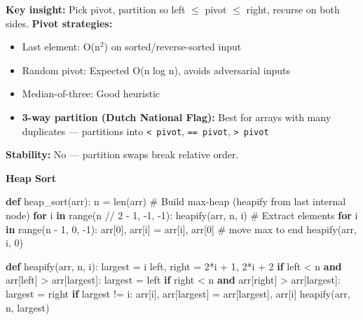 \documentclass[11pt]{article}
\providecommand{\tightlist}{\setlength{\itemsep}{1pt}\setlength{\parskip}{0pt}}
\newenvironment{Shaded}{\begin{snugshade}}{\end{snugshade}}
\newcommand{\BuiltInTok}[1]{\textcolor[rgb]{0.50,0.55,0.55}{#1}}
\newcommand{\CommentTok}[1]{\textcolor[rgb]{0.48,0.49,0.49}{#1}}
\newcommand{\ControlFlowTok}[1]{\textcolor[rgb]{0.99,0.74,0.29}{\textbf{#1}}}
\newcommand{\DecValTok}[1]{\textcolor[rgb]{0.96,0.45,0.00}{#1}}
\newcommand{\KeywordTok}[1]{\textcolor[rgb]{0.81,0.81,0.76}{\textbf{#1}}}
\newcommand{\NormalTok}[1]{\textcolor[rgb]{0.81,0.81,0.76}{#1}}
\newcommand{\OperatorTok}[1]{\textcolor[rgb]{0.81,0.81,0.76}{#1}}
\begin{document}
\textbf{Key insight:} Pick pivot, partition so left \(\leq\) pivot \(\leq\) right, recurse on both sides.
\textbf{Pivot strategies:}

\begin{itemize}
\tightlist
\item
  Last element: O(n\(^2\)) on sorted/reverse-sorted input
\item
  Random pivot: Expected O(n log n), avoids adversarial inputs
\item
  Median-of-three: Good heuristic
\item
  \textbf{3-way partition (Dutch National Flag):} Best for arrays with many duplicates --- partitions into \texttt{\textless{}\ pivot}, \texttt{==\ pivot}, \texttt{\textgreater{}\ pivot}
\end{itemize}

\textbf{Stability:} No --- partition swaps break relative order.

\textbf{Heap Sort}


\begin{Shaded}
\begin{Highlighting}[]
\KeywordTok{def}\NormalTok{ heap\_sort(arr):}
\NormalTok{    n }\OperatorTok{=} \BuiltInTok{len}\NormalTok{(arr)}
    \CommentTok{\# Build max{-}heap (heapify from last internal node)}
    \ControlFlowTok{for}\NormalTok{ i }\KeywordTok{in} \BuiltInTok{range}\NormalTok{(n }\OperatorTok{//} \DecValTok{2} \OperatorTok{{-}} \DecValTok{1}\NormalTok{, }\OperatorTok{{-}}\DecValTok{1}\NormalTok{, }\OperatorTok{{-}}\DecValTok{1}\NormalTok{):}
\NormalTok{        heapify(arr, n, i)}
    \CommentTok{\# Extract elements}
    \ControlFlowTok{for}\NormalTok{ i }\KeywordTok{in} \BuiltInTok{range}\NormalTok{(n }\OperatorTok{{-}} \DecValTok{1}\NormalTok{, }\DecValTok{0}\NormalTok{, }\OperatorTok{{-}}\DecValTok{1}\NormalTok{):}
\NormalTok{        arr[}\DecValTok{0}\NormalTok{], arr[i] }\OperatorTok{=}\NormalTok{ arr[i], arr[}\DecValTok{0}\NormalTok{]  }\CommentTok{\# move max to end}
\NormalTok{        heapify(arr, i, }\DecValTok{0}\NormalTok{)}

\KeywordTok{def}\NormalTok{ heapify(arr, n, i):}
\NormalTok{    largest }\OperatorTok{=}\NormalTok{ i}
\NormalTok{    left, right }\OperatorTok{=} \DecValTok{2}\OperatorTok{*}\NormalTok{i }\OperatorTok{+} \DecValTok{1}\NormalTok{, }\DecValTok{2}\OperatorTok{*}\NormalTok{i }\OperatorTok{+} \DecValTok{2}
    \ControlFlowTok{if}\NormalTok{ left }\OperatorTok{\textless{}}\NormalTok{ n }\KeywordTok{and}\NormalTok{ arr[left] }\OperatorTok{\textgreater{}}\NormalTok{ arr[largest]: largest }\OperatorTok{=}\NormalTok{ left}
    \ControlFlowTok{if}\NormalTok{ right }\OperatorTok{\textless{}}\NormalTok{ n }\KeywordTok{and}\NormalTok{ arr[right] }\OperatorTok{\textgreater{}}\NormalTok{ arr[largest]: largest }\OperatorTok{=}\NormalTok{ right}
    \ControlFlowTok{if}\NormalTok{ largest }\OperatorTok{!=}\NormalTok{ i:}
\NormalTok{        arr[i], arr[largest] }\OperatorTok{=}\NormalTok{ arr[largest], arr[i]}
\NormalTok{        heapify(arr, n, largest)}
\end{Highlighting}
\end{Shaded}
\end{document}

